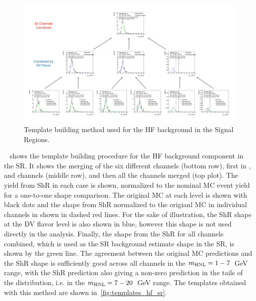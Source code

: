 \begin{figure}[!ht]
    \centering
    \includegraphics[width=\linewidth]{figures/analysis_strategy/template_building/template_building_SR.pdf}
    \caption{Template building method used for the HF background in the Signal Regions.}
    \label{fig:template_building}
\end{figure}

~ shows the template building procedure for the HF background component in the SR. It shows the merging of the six different channels (bottom row), first in \xuu, \xue and \xee channels (middle row), and then all the channels merged (top plot). The yield from ShR in each case is shown, normalized to the nominal MC event yield for a one-to-one shape comparison. The original MC at each level is shown with black dots and the shape from ShR normalized to the origianl MC in individual channels in shown in dashed red lines. For the sake of illustration, the ShR shape at the DV flavor level is also shown in blue, however this shape is not used directly in the analysis. Finally, the shape from the ShR for all channels combined, which is used as the SR background estimate shape in the SR, is shown by the green line. The agreement between the original MC predictions and the ShR shape is sufficiently good across all channels in the $m_{\mathrm{HNL}}=1-7$~GeV range, with the ShR prediction also giving a non-zero prediction in the tails of the distribution, i.e. in the $m_{\mathrm{HNL}}=7-20$~GeV range. The templates obtained with this method are shown in~\cref{fig:templates_hf_sr}. 

